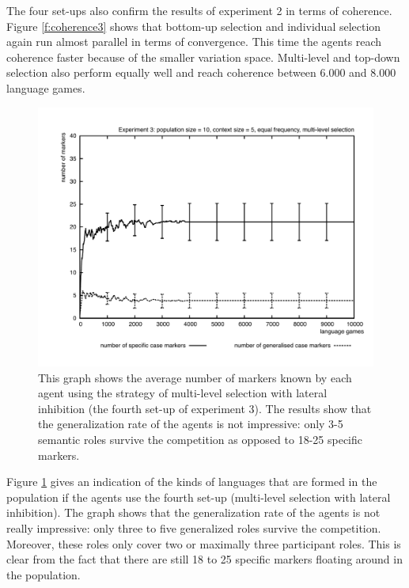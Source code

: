 The four set-ups also confirm the results of experiment 2 in terms of coherence. Figure \ref{f:coherence3} shows that bottom-up selection and individual selection again run almost parallel in terms of convergence. This time the agents reach coherence faster because of the smaller variation space. Multi-level and top-down selection also perform equally well and reach coherence between 6.000 and 8.000 language games.

\begin{figure}[t]
\centerline{\includegraphics[width=\textwidth]{Chapter4/figs/markers3}}
  \caption[Experiment 3: number of markers]{This graph shows the average number of markers known by each agent using the strategy of multi-level selection with lateral inhibition (the fourth set-up of experiment 3). The results show that the generalization rate of the agents is not impressive: only 3-5 semantic roles survive the competition as opposed to 18-25 specific markers.}
   \label{f:markers3}
\end{figure}

Figure \ref{f:markers3} gives an indication of the kinds of languages that are formed in the population if the agents use the fourth set-up (multi-level selection with lateral inhibition). The graph shows that the generalization rate of the agents is not really impressive: only three to five generalized roles survive the competition. Moreover, these roles only cover two or maximally three participant roles. This is clear from the fact that there are still 18 to 25 specific markers floating around in the population.

